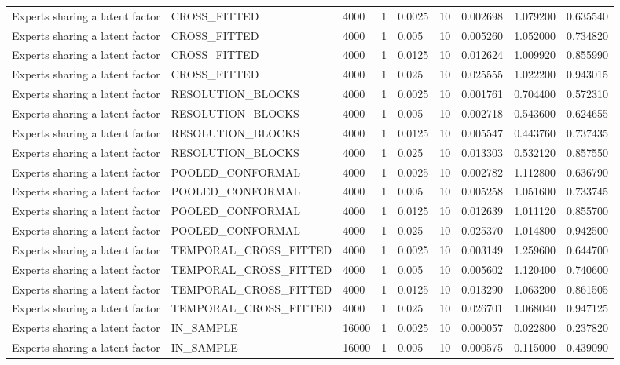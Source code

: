 \begin{tabular}{lllllllll}
Experts sharing a latent factor & CROSS\_FITTED & 4000 & 1 & 0.0025 & 10 & 0.002698 & 1.079200 & 0.635540 \\
Experts sharing a latent factor & CROSS\_FITTED & 4000 & 1 & 0.005 & 10 & 0.005260 & 1.052000 & 0.734820 \\
Experts sharing a latent factor & CROSS\_FITTED & 4000 & 1 & 0.0125 & 10 & 0.012624 & 1.009920 & 0.855990 \\
Experts sharing a latent factor & CROSS\_FITTED & 4000 & 1 & 0.025 & 10 & 0.025555 & 1.022200 & 0.943015 \\
Experts sharing a latent factor & RESOLUTION\_BLOCKS & 4000 & 1 & 0.0025 & 10 & 0.001761 & 0.704400 & 0.572310 \\
Experts sharing a latent factor & RESOLUTION\_BLOCKS & 4000 & 1 & 0.005 & 10 & 0.002718 & 0.543600 & 0.624655 \\
Experts sharing a latent factor & RESOLUTION\_BLOCKS & 4000 & 1 & 0.0125 & 10 & 0.005547 & 0.443760 & 0.737435 \\
Experts sharing a latent factor & RESOLUTION\_BLOCKS & 4000 & 1 & 0.025 & 10 & 0.013303 & 0.532120 & 0.857550 \\
Experts sharing a latent factor & POOLED\_CONFORMAL & 4000 & 1 & 0.0025 & 10 & 0.002782 & 1.112800 & 0.636790 \\
Experts sharing a latent factor & POOLED\_CONFORMAL & 4000 & 1 & 0.005 & 10 & 0.005258 & 1.051600 & 0.733745 \\
Experts sharing a latent factor & POOLED\_CONFORMAL & 4000 & 1 & 0.0125 & 10 & 0.012639 & 1.011120 & 0.855700 \\
Experts sharing a latent factor & POOLED\_CONFORMAL & 4000 & 1 & 0.025 & 10 & 0.025370 & 1.014800 & 0.942500 \\
Experts sharing a latent factor & TEMPORAL\_CROSS\_FITTED & 4000 & 1 & 0.0025 & 10 & 0.003149 & 1.259600 & 0.644700 \\
Experts sharing a latent factor & TEMPORAL\_CROSS\_FITTED & 4000 & 1 & 0.005 & 10 & 0.005602 & 1.120400 & 0.740600 \\
Experts sharing a latent factor & TEMPORAL\_CROSS\_FITTED & 4000 & 1 & 0.0125 & 10 & 0.013290 & 1.063200 & 0.861505 \\
Experts sharing a latent factor & TEMPORAL\_CROSS\_FITTED & 4000 & 1 & 0.025 & 10 & 0.026701 & 1.068040 & 0.947125 \\
Experts sharing a latent factor & IN\_SAMPLE & 16000 & 1 & 0.0025 & 10 & 0.000057 & 0.022800 & 0.237820 \\
Experts sharing a latent factor & IN\_SAMPLE & 16000 & 1 & 0.005 & 10 & 0.000575 & 0.115000 & 0.439090 \\

\end{tabular}

